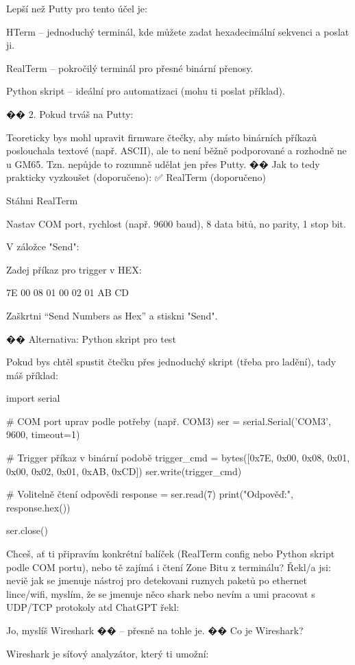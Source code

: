 Lepší než Putty pro tento účel je:

    HTerm – jednoduchý terminál, kde můžete zadat hexadecimální sekvenci a poslat ji.

    RealTerm – pokročilý terminál pro přesné binární přenosy.

    Python skript – ideální pro automatizaci (mohu ti poslat příklad).

�� 2. Pokud trváš na Putty:

Teoreticky bys mohl upravit firmware čtečky, aby místo binárních příkazů poslouchala textové (např. ASCII), ale to není běžně podporované a rozhodně ne u GM65. Tzn. nepůjde to rozumně udělat jen přes Putty.
�� Jak to tedy prakticky vyzkoušet (doporučeno):
✅ RealTerm (doporučeno)

    Stáhni RealTerm

    Nastav COM port, rychlost (např. 9600 baud), 8 data bitů, no parity, 1 stop bit.

    V záložce "Send":

        Zadej příkaz pro trigger v HEX:

        7E 00 08 01 00 02 01 AB CD

        Zaškrtni “Send Numbers as Hex” a stiskni "Send".

�� Alternativa: Python skript pro test

Pokud bys chtěl spustit čtečku přes jednoduchý skript (třeba pro ladění), tady máš příklad:

import serial

# COM port uprav podle potřeby (např. COM3)
ser = serial.Serial('COM3', 9600, timeout=1)

# Trigger příkaz v binární podobě
trigger_cmd = bytes([0x7E, 0x00, 0x08, 0x01, 0x00, 0x02, 0x01, 0xAB, 0xCD])
ser.write(trigger_cmd)

# Volitelně čtení odpovědi
response = ser.read(7)
print("Odpověď:", response.hex())

ser.close()

Chceš, ať ti připravím konkrétní balíček (RealTerm config nebo Python skript podle COM portu), nebo tě zajímá i čtení Zone Bitu z terminálu?
Řekl/a jsi:
neviě jak se jmenuje nástroj pro detekovani ruznych paketů po ethernet lince/wifi, myslím, že se jmenuje něco shark nebo nevím a umi pracovat s UDP/TCP protokoly atd
ChatGPT řekl:

Jo, myslíš Wireshark �� – přesně na tohle je.
�� Co je Wireshark?

Wireshark je síťový analyzátor, který ti umožní:


